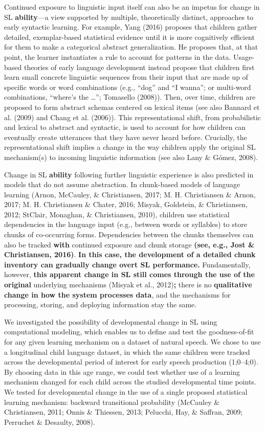 \documentclass[man,mask,floatsintext]{apa6}
\begin{document}
Continued exposure to linguistic input itself can also be an impetus for
change in SL \textbf{ability}---a view supported by multiple,
theoretically distinct, approaches to early syntactic learning. For
example, Yang (2016) proposes that children gather detailed,
exemplar-based statistical evidence until it is more cognitively
efficient for them to make a categorical abstract generalization. He
proposes that, at that point, the learner instantiates a rule to account
for patterns in the data. Usage-based theories of early language
development instead propose that children first learn small concrete
linguistic sequences from their input that are made up of specific words
or word combinations (e.g., \enquote{dog} and \enquote{I wanna}; or
multi-word combinations, \enquote{where's the \ldots{}}; Tomasello
(2008)). Then, over time, children are proposed to form abstract schemas
centered on lexical items (see also Bannard et al. (2009) and Chang et
al. (2006)). This representational shift, from probabilistic and lexical
to abstract and syntactic, is used to account for how children can
eventually create utterances that they have never heard before.
Crucially, the representational shift implies a change in the way
children apply the original SL mechanism(s) to incoming linguistic
information (see also Lany \& Gómez, 2008).

Change in SL \textbf{ability} following further linguistic experience is
also predicted in models that do not assume abstraction. In chunk-based
models of language learning (Arnon, McCauley, \& Christiansen, 2017; M.
H. Christiansen \& Arnon, 2017; M. H. Christiansen \& Chater, 2016;
Misyak, Goldstein, \& Christiansen, 2012; StClair, Monaghan, \&
Christiansen, 2010), children use statistical dependencies in the
language input (e.g., between words or syllables) to store chunks of
co-occurring forms. Dependencies between the chunks themselves can also
be tracked \textbf{with} continued exposure and chunk storage
\textbf{(see, e.g., Jost \& Christiansen, 2016)}. \textbf{In this case,
the development of a detailed chunk inventory can gradually change overt
SL performance. }Fundamentally, however, \textbf{this apparent change in
SL still comes through the use of the original} underlying mechanisms
(Misyak et al., 2012)\textbf{;} there is no \textbf{qualitative change
in how the system processes data}, and the mechanisms for processing,
storing, and deploying information stay the same.

We investigated the possibility of developmental change in SL using
computational modeling, which enables us to define and test the
goodness-of-fit for any given learning mechanism on a dataset of natural
speech. We chose to use a longitudinal child language dataset, in which
the same children were tracked across the developmental period of
interest for early speech production (1;0--4;0). By choosing data in
this age range, we could test whether use of a learning mechanism
changed for each child across the studied developmental time points. We
tested for developmental change in the use of a single proposed
statistical learning mechanism: backward transitional probability
(McCauley \& Christiansen, 2011; Onnis \& Thiessen, 2013; Pelucchi, Hay,
\& Saffran, 2009; Perruchet \& Desaulty, 2008).
\end{document}
